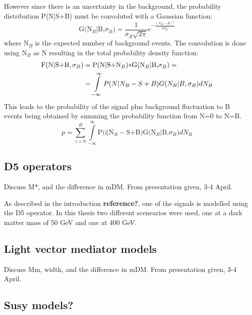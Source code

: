However since there is an uncertainty in the background, the probability distribution P(N|S+B) must be convoluted with a Gaussian function:
\begin{equation}
 \text{G(N$_B$|B,$\sigma_B$)}=\frac{1}{\sigma_B \sqrt{2 \pi}} e^{-\frac{(N_B-B)^2}{2\sigma_B^2}}
\end{equation}
where N$_B$ is the expected number of background events. The convolution is done using N$_B$ as N resulting in the total probability density function:
\begin{align}
\text{F(N|S+B},\sigma_B) &= \text{P(N|S+N$_B$)$\ast$G(N$_B$|B,$\sigma_B$)}= \notag \\
&=\int\limits_{-\infty}^{\infty}P(N|N_B - S+B)G(N_B|B,\sigma_B) dN_B
\end{align}
This leads to the probability of the signal plus background fluctuation to B events being obtained by summing the probability function from N=0 to N=B.
\begin{equation}
p = \sum\limits_{i=0}^{B} \int\limits_{-\infty}^{\infty} \text{P(i|N$_B - $S+B)G(N$_B$|B,$\sigma_B$)} dN_B
\end{equation}



\subsection{D5 operators}
Discuss M*, and the difference in mDM. From presentation given, 3-4 April. 

As described in the introduction \textbf{reference?}, one of the signals is modelled using the D5 operator. In this thesis two different scenearios were used, one at a dark matter mass of 50 GeV and one at 400 GeV.

\subsection{Light vector mediator models}
Discuss Mm, width, and the difference in mDM. From presentation given, 3-4 April.
\subsection{Susy models?}
